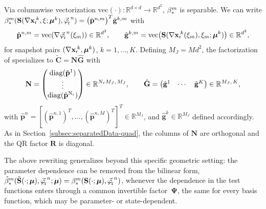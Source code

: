 \documentclass[onefignum,onetabnum]{siamart251104}
\newcommand{\bv}[1]{{\mathbf #1}}
\newcommand{\bt}[1]{{\mathbf{#1}}}
\newcommand{\rom}[1]{{{#1}_{\rm{r}}}}
\newcommand{\Nr}{{N_r}}
\newcommand{\R}{\mathbb{R}}
\newcommand{\tAlg}{{\bv{p}}}
\newcommand{\xp}{{\xi}} %
\newcommand{\Cp}{{\bt{C}}}
\newcommand{\mydiag}{\rm{diag}}
\newcommand{\xrfVec}{{\nabla \rom{\bv{x}}}}       %
\newcommand{\phiVec}{{\rom{\vec{\varphi}\mkern-2mu}}} %
\newcommand{\nlField}{{\bt{S}}}                    %
\newcommand{\geoTrans}{{\boldsymbol{\Psi}}}        %
\begin{document}
Via columnwise vectorization $\mathrm{vec}(\cdot): \R^{d\times d}\to\R^{d^2}$,
$\beta_{\rm{*}}^m$ is separable. We can write
$\beta_{\rm{*}}^m(\nlField(\xrfVec\!^k,\xi;\boldsymbol{\mu}^k), \phiVec^n) = \bigl(\hat{\bv{p}}^{n,m}\bigr)^T \hat{\bv{g}}^{k,m}$ with
\begin{align*}
\hat{\bv{p}}^{n,m} = \mathrm{vec}\!\left(\nabla\phiVec^n(\xp_m)\right) \in \R^{d^2}, \qquad
\hat{\bv{g}}^{k,m} = \mathrm{vec}\!\left(\nlField(\xrfVec\!^k(\xp_m),\xp_m;\boldsymbol{\mu}^k)\right) \in \R^{d^2},
\end{align*}
for snapshot pairs $(\xrfVec\!^k,\boldsymbol{\mu}^k)$, $k=1,\ldots,K$.
Defining $M_J = Md^2$, the factorization of  specializes to $\tilde{\Cp} = {\bt{N}} \hat{\bt{G}}$ with
{\small
\begin{align*}
{\bt{N}} = \begin{pmatrix} \mydiag(\hat{\tAlg}^1) \\ \vdots \\ \mydiag(\hat{\tAlg}^{\Nr})
\end{pmatrix} \in \R^{\Nr M_J,\, M_J}, \qquad
\hat{\bt{G}} = \begin{pmatrix} \hat{\bv{g}}^1 & \cdots & \hat{\bv{g}}^K \end{pmatrix}
\in \R^{M_J,\, K},
\end{align*}
}%
with $\hat{\tAlg}^n = [(\hat{\bv{p}}^{n,1})^T,\ldots,(\hat{\bv{p}}^{n,M})^T]^T \in \R^{M_J}$, and $\hat{\bv{g}}^k \in \R^{M_J}$ defined accordingly.
As in Section~\ref{subsec:separatedData-quad}, the columns of ${\bt{N}}$ are orthogonal
and the QR factor $\bt{R}$ is diagonal.

\begin{rmrk}\label{rem:param-dep-trick}
The above rewriting generalizes beyond this specific geometric setting: the parameter dependence can be removed from the bilinear form,
$\tilde{\beta}_{\rm{*}}^m(\tilde{\nlField}(\cdot;\boldsymbol{\mu}), \phiVec^n;\boldsymbol{\mu}) = \beta_{\rm{*}}^m(\nlField(\cdot;\boldsymbol{\mu}), \phiVec^n)$,
whenever the dependence in the test functions enters through a common invertible factor~$\geoTrans$, the same for every basis function,
which may be parameter- or state-dependent.
\end{rmrk}
\end{document}
